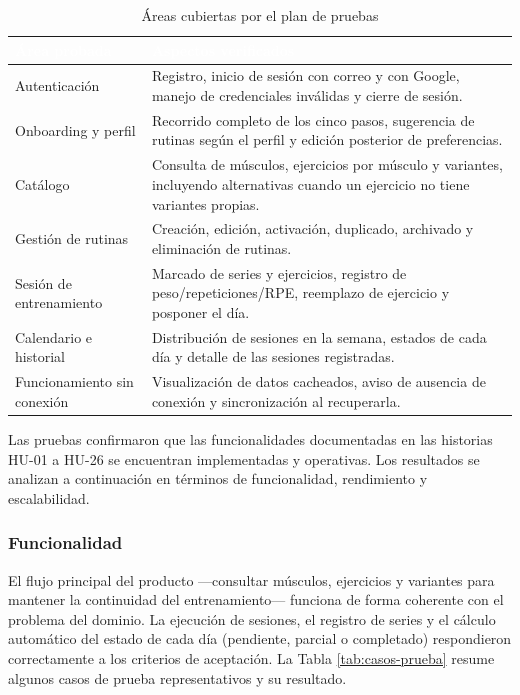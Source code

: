 \documentclass[12pt,letterpaper]{article}
\newcommand{\gymtableheaderrow}{\rowcolor{gymblue}}
\newcommand{\gymth}[1]{\textcolor{white}{\textbf{#1}}}
\begin{document}
\begin{table}[H]
\centering
{}
\begin{tabularx}{0.98\textwidth}{L{4.2cm} Y}
\toprule
\gymtableheaderrow
\gymth{Área probada} & \gymth{Aspectos verificados} \\
\midrule
Autenticación & Registro, inicio de sesión con correo y con Google, manejo de credenciales inválidas y cierre de sesión. \\
Onboarding y perfil & Recorrido completo de los cinco pasos, sugerencia de rutinas según el perfil y edición posterior de preferencias. \\
Catálogo & Consulta de músculos, ejercicios por músculo y variantes, incluyendo alternativas cuando un ejercicio no tiene variantes propias. \\
Gestión de rutinas & Creación, edición, activación, duplicado, archivado y eliminación de rutinas. \\
Sesión de entrenamiento & Marcado de series y ejercicios, registro de peso/repeticiones/RPE, reemplazo de ejercicio y posponer el día. \\
Calendario e historial & Distribución de sesiones en la semana, estados de cada día y detalle de las sesiones registradas. \\
Funcionamiento sin conexión & Visualización de datos cacheados, aviso de ausencia de conexión y sincronización al recuperarla. \\
\bottomrule
\end{tabularx}
\caption{Áreas cubiertas por el plan de pruebas}
\label{tab:plan-pruebas}
\end{table}

Las pruebas confirmaron que las funcionalidades documentadas en las historias HU-01 a HU-26 se encuentran implementadas y operativas. Los resultados se analizan a continuación en términos de funcionalidad, rendimiento y escalabilidad.

\subsubsection{Funcionalidad}

El flujo principal del producto ---consultar músculos, ejercicios y variantes para mantener la continuidad del entrenamiento--- funciona de forma coherente con el problema del dominio. La ejecución de sesiones, el registro de series y el cálculo automático del estado de cada día (pendiente, parcial o completado) respondieron correctamente a los criterios de aceptación. La Tabla \ref{tab:casos-prueba} resume algunos casos de prueba representativos y su resultado.
\end{document}
